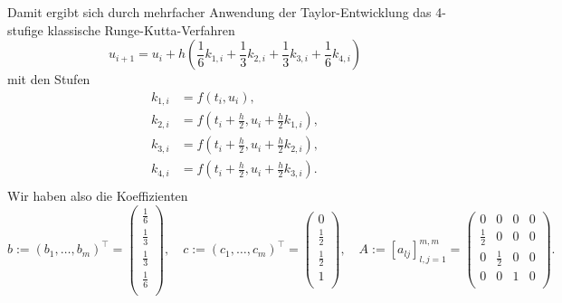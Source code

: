 Damit ergibt sich durch mehrfacher Anwendung der Taylor-Entwicklung das 4-stufige klassische Runge-Kutta-Verfahren
\[
    u_{i+1} = u_i + h\left( \frac{1}{6}k_{1,i} + \frac{1}{3} k_{2,i} + \frac{1}{3} k_{3,i} + \frac{1}{6} k_{4,i} \right)
\]
mit den Stufen
\begin{align*}
    k_{1,i} &= f(t_i,u_i), \\
    k_{2,i} &= f\left(t_i + \frac{h}{2}, u_i + \frac{h}{2}k_{1,i}\right), \\
    k_{3,i} &= f\left(t_i + \frac{h}{2}, u_i + \frac{h}{2}k_{2,i}\right), \\
    k_{4,i} &= f\left(t_i + \frac{h}{2}, u_i + \frac{h}{2}k_{3,i}\right). \\
\end{align*}
Wir haben also die Koeffizienten
\[
    b := \left( b_1, \dots , b_m \right)^{\intercal}
    =\left( \begin{matrix}
                \frac{1}{6}\\
                \frac{1}{3}\\
                \frac{1}{3}\\
                \frac{1}{6}\\
    \end{matrix}\right), \quad
    c := \left( c_1, \dots, c_m \right)^{\intercal}
    = \left( \begin{matrix}
                 0\\
                 \frac{1}{2}\\
                 \frac{1}{2}\\
                 1\\
    \end{matrix} \right), \quad
    A:=[a_{lj}]_{l,j=1}^{m,m} = \left( \begin{matrix}
                             0 & 0 & 0 & 0\\
                             \frac{1}{2} & 0 & 0 & 0 \\
                             0 & \frac{1}{2} & 0 & 0 \\
                             0 & 0 & 1 & 0\\
    \end{matrix} \right).
\]
